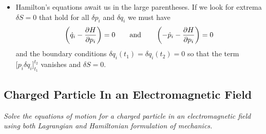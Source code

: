\documentclass[11pt, a4paper]{article}
\newcommand{\eqtext}[1]{\qquad \text{#1} \qquad}
\begin{document}
\begin{itemize}
	\item Hamilton's equations await us in the large parentheses. If we look for extrema $ \delta S = 0 $ that hold for all $ \delta p_{i} $ and $ \delta q_{i} $ we must have
	\begin{equation*}
		\left(\dot{q}_{i} - \pdv{H}{p_{i}}\right) = 0 \eqtext{and} \left(-\dot{p}_{i} - \pdv{H}{p_{i}}\right) = 0
	\end{equation*}
	and the boundary conditions $ \delta q_{i}(t_{1}) = \delta q_{i}(t_{2}) = 0 $ so that the term $ \big[p_{i}\delta q_{i} \big]_{t_{1}}^{t_{2}} $ vanishes and $ \delta S = 0 $.
\end{itemize}


\subsection{Charged Particle In an Electromagnetic Field}
\textit{Solve the equations of motion for a charged particle in an electromagnetic field using both Lagrangian and Hamiltonian formulation of mechanics.}
\end{document}
